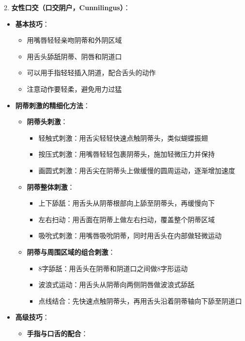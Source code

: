 \documentclass[12pt,UTF8]{ctexbook}
\begin{document}
2. \textbf{女性口交（口交阴户，Cunnilingus）}：
  \begin{itemize}
  \item \textbf{基本技巧}：
    \begin{itemize}
    \item 用嘴唇轻轻亲吻阴蒂和外阴区域
    \item 用舌头舔舐阴蒂、阴唇和阴道口
    \item 可以用手指轻轻插入阴道，配合舌头的动作
    \item 注意动作要轻柔，避免用力过猛
    \end{itemize}
  \item \textbf{阴蒂刺激的精细化方法}：
    \begin{itemize}
    \item \textbf{阴蒂头刺激}：
      \begin{itemize}
      \item 轻触式刺激：用舌尖轻轻快速点触阴蒂头，类似蝴蝶振翅
      \item 按压式刺激：用嘴唇轻轻包裹阴蒂头，施加轻微压力并保持
      \item 画圆式刺激：用舌尖在阴蒂头上做缓慢的圆周运动，逐渐增加速度
      \end{itemize}
    \item \textbf{阴蒂整体刺激}：
      \begin{itemize}
      \item 上下舔舐：用舌头从阴蒂根部向上舔至阴蒂头，再缓慢向下
      \item 左右扫动：用舌面在阴蒂上做左右扫动，覆盖整个阴蒂区域
      \item 吸吮式刺激：用嘴唇吸吮阴蒂，同时用舌头在内部做轻微运动
      \end{itemize}
    \item \textbf{阴蒂与周围区域的组合刺激}：
      \begin{itemize}
      \item 8字舔舐：用舌头在阴蒂和阴道口之间做8字形运动
      \item 波浪式运动：用舌头从阴蒂向两侧阴唇做波浪式舔舐
      \item 点线结合：先快速点触阴蒂头，再用舌头沿着阴蒂轴向下舔至阴道口
      \end{itemize}
    \end{itemize}
  \item \textbf{高级技巧}：
    \begin{itemize}
    \item \textbf{手指与口舌的配合}：
      \begin{itemize}

\end{itemize}
\end{itemize}
\end{itemize}
\end{document}

